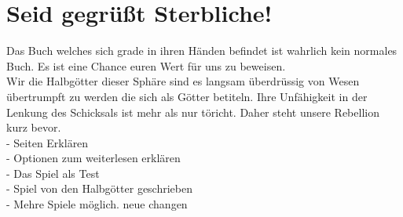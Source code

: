 \documentclass[12pt,a4paper,twoside]{book}
\begin{document}
\newpage


\section*{Seid gegrüßt Sterbliche!}

Das Buch welches sich grade in ihren Händen befindet ist wahrlich kein normales Buch. Es ist eine Chance euren Wert für uns zu beweisen.\\
Wir die Halbgötter dieser Sphäre sind es langsam überdrüssig von Wesen übertrumpft zu werden die sich als Götter betiteln. Ihre Unfähigkeit in der Lenkung des Schicksals ist mehr als nur töricht. Daher steht unsere Rebellion kurz bevor.\\





\vskip 2cm
- Seiten Erklären\\
- Optionen zum weiterlesen erklären\\
- Das Spiel als Test\\
- Spiel von den Halbgötter geschrieben\\
- Mehre Spiele möglich. neue changen
\end{document}
